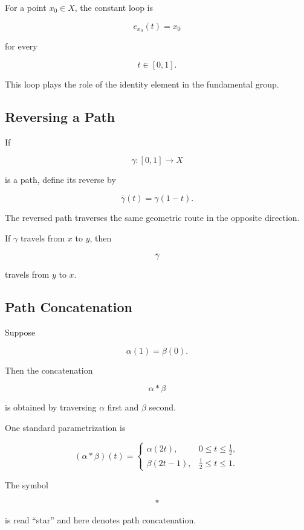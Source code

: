 For a point \(x_0\in X\), the constant loop is

\[
\boxed{
e_{x_0}(t)=x_0
}
\]

for every

\[
t\in[0,1].
\]

This loop plays the role of the identity element in the fundamental group.

\subsection{Reversing a Path}
\label{subsec:reverse-path}

If

\[
\gamma:[0,1]\to X
\]

is a path, define its reverse by

\[
\boxed{
\overline{\gamma}(t)
=
\gamma(1-t).
}
\]

The reversed path traverses the same geometric route in the opposite
direction.

If \(\gamma\) travels from \(x\) to \(y\), then

\[
\overline{\gamma}
\]

travels from \(y\) to \(x\).

\subsection{Path Concatenation}
\label{subsec:path-concatenation}

Suppose

\[
\alpha(1)=\beta(0).
\]

Then the concatenation

\[
\alpha*\beta
\]

is obtained by traversing \(\alpha\) first and \(\beta\) second.

One standard parametrization is

\[
\boxed{
(\alpha*\beta)(t)
=
\begin{cases}
\alpha(2t),
&
0\leq t\leq \frac12,
\\[4pt]
\beta(2t-1),
&
\frac12\leq t\leq1.
\end{cases}
}
\]

The symbol

\[
*
\]

is read ``star'' and here denotes path concatenation.

